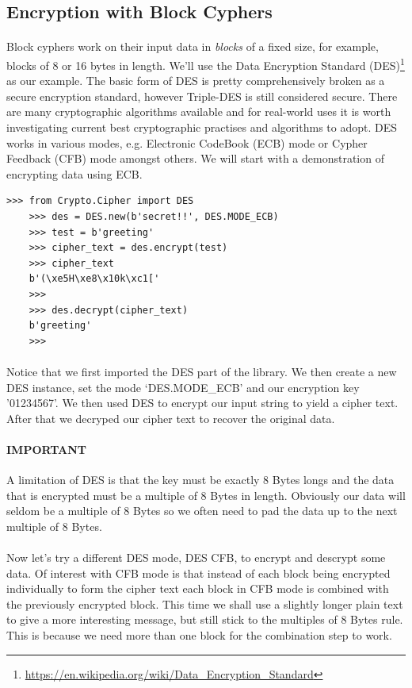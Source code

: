 \documentclass[12pt, a4paper, oneside]{book}
\begin{document}
{\subsection{Encryption with Block Cyphers}
\paragraph{} Block cyphers work on their input data in \emph{blocks} of a fixed size, for example, blocks of 8 or 16 bytes in length. We'll use the Data Encryption Standard (DES)\footnote{\url{https://en.wikipedia.org/wiki/Data_Encryption_Standard}} as our example. The basic form of DES is pretty comprehensively broken as a secure encryption standard, however Triple-DES is still considered secure. There are many cryptographic algorithms available and for real-world uses it is worth investigating current best cryptographic practises and algorithms to adopt. DES works in various modes, e.g. Electronic CodeBook (ECB) mode or Cypher Feedback (CFB) mode amongst others. We will start with a demonstration of encrypting data using ECB.

\begin{lstlisting}[style=DOS]
    >>> from Crypto.Cipher import DES
    >>> des = DES.new(b'secret!!', DES.MODE_ECB)
    >>> test = b'greeting'
    >>> cipher_text = des.encrypt(test)
    >>> cipher_text
    b'(\xe5H\xe8\x10k\xc1['
    >>> 
    >>> des.decrypt(cipher_text)
    b'greeting'
    >>> 
\end{lstlisting}

\paragraph{} Notice that we first imported the DES part of the library. We then create a new DES instance, set the mode `DES.MODE\_ECB' and our encryption key '01234567'. We then used DES to encrypt our input string to yield a cipher text. After that we decryped our cipher text to recover the original data.

\paragraph{IMPORTANT} A limitation of DES is that the key must be exactly 8 Bytes longs and the data that is encrypted must be a multiple of 8 Bytes in length. Obviously our data will seldom be a multiple of 8 Bytes so we often need to pad the data up to the next multiple of 8 Bytes.

\paragraph{} Now let's try a different DES mode, DES CFB, to encrypt and descrypt some data. Of interest with CFB mode is that instead of each block being encrypted individually to form the cipher text each block in CFB mode is combined with the previously encrypted block. This time we shall use a slightly longer plain text to give a more interesting message, but still stick to the multiples of 8 Bytes rule. This is because we need more than one block for the combination step to work. 

}
\end{document}
